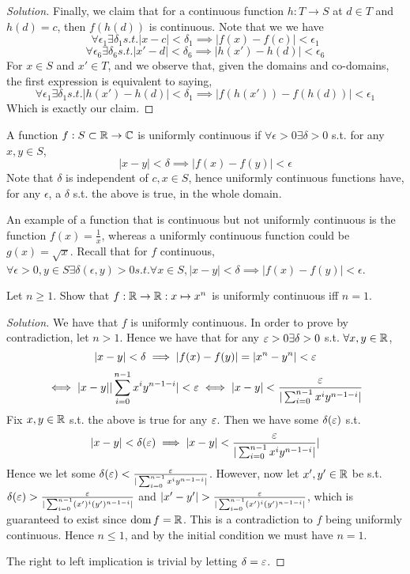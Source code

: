 \begin{proof}[Solution]
  Finally, we claim that for a continuous function $h:T\to S$ at $d\in T$ and $h(d)=c$,
  then $f(h(d))$ is continuous. Note that we we have 
  \[\forall \epsilon_1 \exists\delta_1 s.t. |x-c|<\delta_1 \implies
  |f(x)-f(c)|<\epsilon_1\]
  \[\forall \epsilon_6 \exists\delta_6 s.t. |x'-d|<\delta_6 \implies
  |h(x')-h(d)|<\epsilon_6\]
  For $x\in S$ and $x'\in T$, and we observe that, given the domains and co-domains, the
  first expression is equivalent to saying,
  \[\forall \epsilon_1 \exists\delta_1 s.t. |h(x')-h(d)|<\delta_1 \implies
  |f(h(x'))-f(h(d))|<\epsilon_1\]
  Which is exactly our claim.

\end{proof}


\begin{definition}
  A function $f:S\subset\mathbb R\to\mathbb C$ is uniformly continuous if
  $\forall\epsilon>0\exists\delta>0$ s.t. for any $x,y\in S$,
  \[|x-y|<\delta\implies |f(x)-f(y)|<\epsilon\]
  Note that $\delta$ is independent of $c,x\in S$, hence uniformly continuous functions
  have, for any $\epsilon$, a $\delta$ s.t. the above is true, in the whole domain.
  \label{uniformlyContinuous}
\end{definition}
An example of a function that is continuous but not uniformly continuous is the function
$f(x)=\frac{1}{x}$, whereas a uniformly continuous function could be $g(x)=
\sqrt{x}$. Recall that for $f$ continuous, $\forall\epsilon>0,y\in S\exists
\delta(\epsilon,y)>0 s.t. \forall x\in S, |x-y|<\delta\implies|f(x)-f(y)|<\epsilon$.

\begin{example}
  Let $n\geq 1$. Show that $f:\mathbb R\to\mathbb R : x\mapsto x^n$ is uniformly continuous iff $n=1$.
\end{example}
\begin{proof}[Solution]
  We have that $f$ is uniformly continuous. In order to prove by contradiction, let $n>1$.
  Hence we have that for any $\varepsilon>0\exists\delta>0$ s.t. $\forall x,y\in\mathbb R$,
  \[|x-y|<\delta \implies |f(x)-f(y)|=|x^n-y^n|<\varepsilon\]
  \[\iff |x-y||\sum_{i=0}^{n-1}x^iy^{n-1-i}|<\varepsilon \iff |x-y|<
  \frac{\varepsilon}{|\sum_{i=0}^{n-1}x^iy^{n-1-i}|}\]
  Fix $x,y\in\mathbb R$ s.t. the above is true for any $\varepsilon$. Then we have some
  $\delta (\varepsilon)$ s.t. 
  \[|x-y|<\delta (\varepsilon )\implies |x-y|<\frac{\varepsilon}{|\sum_{i=0}^{n-1}x^iy^{n-1-i}|}|\]
  Hence we let some $\delta (\varepsilon )<\frac{\varepsilon}{|\sum_{i=0}^{n-1}x^iy^{n-1-i}|}$. However, now let
  $x',y'\in\mathbb R$ be s.t. $\delta (\varepsilon
  )>\frac{\varepsilon}{|\sum_{i=0}^{n-1}(x')^i(y')^{n-1-i}|}$ and
  $|x'-y'|>\frac{\eps}{|\sum_{i=0}^{n-1}(x')^i(y')^{n-1-i}|}$, which is guaranteed to
  exist since $\operatorname{dom} f=\mathbb R$. This is a contradiction to $f$ being uniformly continuous. Hence $n\leq 1$, and by the initial
  condition we must have $n=1$.

  The right to left implication is trivial by letting $\delta=\varepsilon$.
\end{proof}

